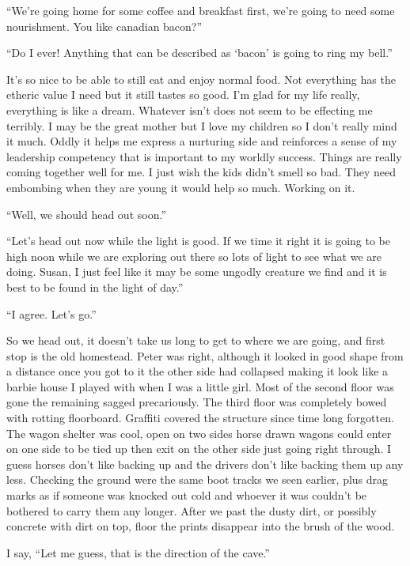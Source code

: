 ``We're going home for some coffee and breakfast first, we're going to need some nourishment. You like canadian bacon?''

``Do I ever! Anything that can be described as `bacon' is going to ring my bell.''

It's so nice to be able to still eat and enjoy normal food. Not everything has the etheric value I need but it still tastes so good. I'm glad for my life really, everything is like a dream. Whatever isn't does not seem to be effecting me terribly. I may be the great mother but I love my children so I don't really mind it much. Oddly it helps me express a nurturing side and reinforces a sense of my leadership competency that is important to my worldly success. Things are really coming together well for me. I just wish the kids didn't smell so bad. They need embombing when they are young it would help so much. Working on it.

``Well, we should head out soon.''

``Let's head out now while the light is good. If we time it right it is going to be high noon while we are exploring out there so lots of light to see what we are doing. Susan, I just feel like it may be some ungodly creature we find and it is best to be found in the light of day.''

``I agree. Let's go.''

So we head out, it doesn't take us long to get to where we are going, and first stop is the old homestead. Peter was right, although it looked in good shape from a distance once you got to it the other side had collapsed making it look like a barbie house I played with when I was a little girl. Most of the second floor was gone the remaining sagged precariously. The third floor was completely bowed with rotting floorboard. Graffiti covered the structure since time long forgotten. The wagon shelter was cool, open on two sides horse drawn wagons could enter on one side to be tied up then exit on the other side just going right through. I guess horses don't like backing up and the drivers don't like backing them up any less. Checking the ground were the same boot tracks we seen earlier, plus drag marks as if someone was knocked out cold and whoever it was couldn't be bothered to carry them any longer. After we past the dusty dirt, or possibly concrete with dirt on top, floor the prints disappear into the brush of the wood.

I say,  ``Let me guess, that is the direction of the cave.''

